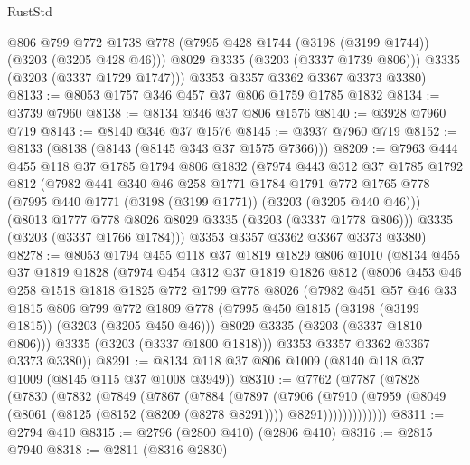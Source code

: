 \begin{lexlean}{RustStd}
\begin{coremodule}
{\begin{coremodule}
{{{{{{{{{{{{{{{          @806
          @799
          @772
          @1738
          @778
          (@7995 @428 @1744 (@3198 (@3199 @1744)) (@3203 (@3205 @428 @46)))
          @8029
          @3335
          (@3203 (@3337 @1739 @806)))
        @3335
        (@3203 (@3337 @1729 @1747)))
      @3353
      @3357
      @3362
      @3367
      @3373
      @3380)
@8133 := @8053 @1757 @346 @457 @37 @806 @1759 @1785 @1832
@8134 := @3739 @7960
@8138 := @8134 @346 @37 @806 @1576
@8140 := @3928 @7960 @719
@8143 := @8140 @346 @37 @1576
@8145 := @3937 @7960 @719
@8152 := @8133 (@8138 (@8143 (@8145 @343 @37 @1575 @7366)))
@8209 := @7963
    @444
    @455
    @118
    @37
    @1785
    @1794
    @806
    @1832
    (@7974
      @443
      @312
      @37
      @1785
      @1792
      @812
      (@7982
        @441
        @340
        @46
        @258
        @1771
        @1784
        @1791
        @772
        @1765
        @778
        (@7995 @440 @1771 (@3198 (@3199 @1771)) (@3203 (@3205 @440 @46)))
        (@8013 @1777 @778 @8026 @8029 @3335 (@3203 (@3337 @1778 @806)))
        @3335
        (@3203 (@3337 @1766 @1784)))
      @3353
      @3357
      @3362
      @3367
      @3373
      @3380)
@8278 := @8053
    @1794
    @455
    @118
    @37
    @1819
    @1829
    @806
    @1010
    (@8134
      @455
      @37
      @1819
      @1828
      (@7974
        @454
        @312
        @37
        @1819
        @1826
        @812
        (@8006
          @453
          @46
          @258
          @1518
          @1818
          @1825
          @772
          @1799
          @778
          @8026
          (@7982
            @451
            @57
            @46
            @33
            @1815
            @806
            @799
            @772
            @1809
            @778
            (@7995 @450 @1815 (@3198 (@3199 @1815)) (@3203 (@3205 @450 @46)))
            @8029
            @3335
            (@3203 (@3337 @1810 @806)))
          @3335
          (@3203 (@3337 @1800 @1818)))
        @3353
        @3357
        @3362
        @3367
        @3373
        @3380))
@8291 := @8134 @118 @37 @806 @1009 (@8140 @118 @37 @1009 (@8145 @115 @37 @1008 @3949))
@8310 := @7762
    (@7787
      (@7828
        (@7830
          (@7832
            (@7849
              (@7867
                (@7884
                  (@7897
                    (@7906
                      (@7910
                        (@7959
                          (@8049 (@8061 (@8125 (@8152 (@8209 (@8278 @8291)))) @8291)))))))))))))
@8311 := @2794 @410
@8315 := @2796 (@2800 @410) (@2806 @410)
@8316 := @2815 @7940
@8318 := @2811 (@8316 @2830)
}}}}}}}}}}}}}}}
\end{coremodule}}
\end{coremodule}
\end{lexlean}
